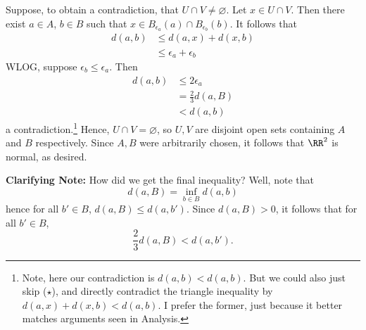 \documentclass{fkpset}
\begin{document}
\begin{solution}
    Suppose, to obtain a contradiction, that $U \cap V \neq
    \varnothing$. Let $x \in U \cap V$. Then there exist $a \in A$, $b
    \in B$ such that $x \in B_{\epsilon_a}(a) \cap B_{\epsilon_b}(b)$.
    It follows that
    \begin{align*}
      d(a,b)
      &\leq d(a,x) + d(x,b) \tag{$\star$}\\
      &\leq \epsilon_a + \epsilon_b
    \end{align*}
    WLOG, suppose $\epsilon_b \leq \epsilon_a$. Then
    \begin{align*}
      d(a,b)
      &\leq 2\epsilon_a \\
      &= \frac{2}{3} d(a,B)  \\
      &< d(a,b)
    \end{align*}
    a contradiction.\footnote{Note, here our contradiction is $d(a,b)
      < d(a,b)$. But we could also just skip ($\star$), and directly
      contradict the triangle inequality by $d(a,x) + d(x,b) <
      d(a,b)$. I prefer the former, just because it better matches
      arguments seen in Analysis.} Hence, $U \cap V = \varnothing$, so
    $U,V$ are disjoint open sets containing $A$ and $B$ respectively.
    Since $A,B$ were arbitrarily chosen, it follows that $\RR^2$ is
    normal, as desired.
    \begin{leftbar}\small %
      \color{red} \textbf{Clarifying Note:} How did we get the final
      inequality? Well, note that
      \[
        d(a,B) = \inf_{b \in B} d(a,b)
      \]
      hence for all $b' \in B$, $d(a,B) \leq d(a,b')$. Since $d(a,B) >
      0$, it follows that for all $b' \in B$,
      \[
        \frac{2}{3}d(a,B) < d(a,b').
      \]
    \end{leftbar}
  \end{solution}
  \clearpage

\end{document}
